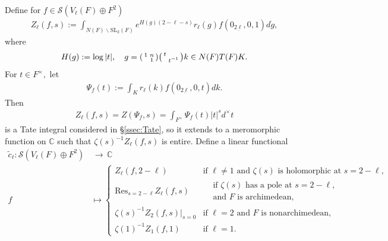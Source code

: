 \documentclass[11pt,a4paper,reqno]{amsart}
\theoremstyle{remark}
\numberwithin{equation}{section}
\newcommand{\SL}{\mathrm{SL}}
\newcommand{\lto}{\,\longrightarrow\,}
\newcommand{\CC}{\mathbb{C}}
\theoremstyle{definition}
\numberwithin{equation}{section}
\newenvironment{psmatrix}
  {\left(\begin{smallmatrix}}
  {\end{smallmatrix}\right)}
\begin{document}
Define for $f\in \mathcal{S}(V_\ell(F)\oplus F^2)$
\begin{align*}
    Z_{\ell}(f,s):=\int_{N(F)\backslash \SL_2(F)} e^{H(g)(2-\ell-s)}r_\ell(g)f(0_{\underline{2\ell}},0,1)d\dot{g},
\end{align*} 
where 
\begin{align*}
    H(g):=\log|t|,\quad g=\begin{psmatrix}
        1 &  n\\
         & 1
    \end{psmatrix}\begin{psmatrix}
        t & \\
         & t^{-1}
    \end{psmatrix}k\in N(F)T(F)K.
\end{align*}
For $t\in F^\times,$ let 
\begin{align*}
    \Psi_f(t):=\int_{K} r_\ell(k)f(0_{\underline{2\ell}},0,t)dk.
\end{align*}
Then 
\begin{align*}
     Z_{\ell}(f,s)=Z(\Psi_f,s)=\int_{F^\times}\Psi_f(t)|t|^s d^\times t
\end{align*}
is a Tate integral considered in \S \ref{ssec:Tate}, so it extends to a meromorphic function on $\CC$ such that $\zeta(s)^{-1}Z_\ell(f,s)$ is entire. Define a linear functional
\begin{align*}
    \tilde{c}_\ell:\mathcal{S}(V_{\ell}(F)\oplus F^2)&\lto \CC\\
    f&\mapsto \begin{cases}
        Z_{\ell}(f,2-\ell) & \textrm{if } \ell\neq 1 \textrm{ and } \zeta(s) \textrm{ is holomorphic at } s=2-\ell,\\
        \mathrm{Res}_{s=2-\ell}Z_{\ell}(f,s) & \begin{aligned}
&\textrm{if } \zeta(s) \textrm{ has a pole at } s=2-\ell,  \\
&\textrm{and } F \textrm{ is archimedean},
\end{aligned}\\
\zeta(s)^{-1}Z_2(f,s)\bigg|_{s=0} & \textrm{if } \ell=2 \textrm{ and } F \textrm{ is nonarchimedean},\\
        \zeta(1)^{-1}Z_{1}(f,1) &\textrm{if } \ell=1.
    \end{cases}
\end{align*}
\end{document}
